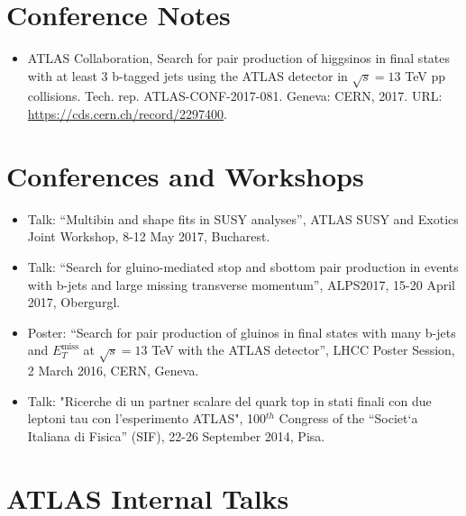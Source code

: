 \documentclass[11pt,a4paper]{moderncv}
\begin{document}
\section{Conference Notes}
\begin{itemize}
\item ATLAS Collaboration, Search for pair production of higgsinos in final states with at least 3 b-tagged jets using the ATLAS detector in $\sqrt{s}=13$ TeV pp collisions. Tech. rep. ATLAS-CONF-2017-081. Geneva: CERN, 2017. URL: \href{https://cds.cern.ch/record/2297400}{\color{color1}https://cds.cern.ch/record/2297400}.
\end{itemize}


\section{Conferences and Workshops}
\begin{itemize}
\item Talk: “Multibin and shape fits in SUSY analyses”, ATLAS SUSY and Exotics Joint Workshop, 8-12 May 2017, Bucharest.
\item Talk: “Search for gluino-mediated stop and sbottom pair production in events with b-jets and large missing transverse momentum”, ALPS2017, 15-20 April 2017, Obergurgl.
\item Poster: “Search for pair production of gluinos in final states with many b-jets and $E_T^{\mathrm{miss}}$ at $\sqrt{s}=13$ TeV with the ATLAS detector”, LHCC Poster Session, 2 March 2016, CERN, Geneva.
\item Talk: "Ricerche di un partner scalare del quark top in stati finali con due leptoni tau con l'esperimento ATLAS", 100$^{th}$ Congress of the “Societ`a Italiana di Fisica” (SIF), 22-26 September 2014, Pisa.
\end{itemize}

\iffalse
\section{ATLAS Internal Talks}


\end{document}
